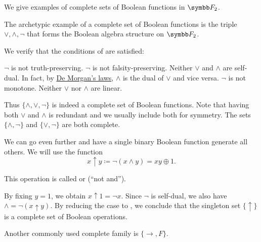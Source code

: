 \begin{example}\label{ex:thm:posts_completeness_theorem}
  We give examples of complete sets of Boolean functions in \( \BF_2 \).

  \begin{ExEnum}
     The archetypic example of a complete set of Boolean functions is the triple \( \vee, \wedge, \neg \) that forms the Boolean algebra structure on \( \BF_2 \).

    We verify that the conditions of  are satisfied:
    \begin{RefList}
       \( \neg \) is not truth-preserving.
       \( \neg \) is not falsity-preserving.
       Neither \( \vee \) and \( \wedge \) are self-dual. In fact, by \hyperref[thm:de_morgans_laws]{De Morgan's laws}, \( \wedge \) is the dual of \( \vee \) and vice versa.
       \( \neg \) is not monotone.
       Neither \( \vee \) nor \( \wedge \) are linear.
    \end{RefList}

    Thus \( \{ \wedge, \vee, \neg \} \) is indeed a complete set of Boolean functions. Note that having both \( \vee \) and \( \wedge \) is redundant and we usually include both for symmetry. The sets \( \{ \wedge, \neg \} \) and \( \{ \vee, \neg \} \) are both complete.

     We can go even further and have a single binary Boolean function generate all others. We will use the function
    \begin{equation}\label{eq:ex:posts_completeness_theorem/nand}
      x \uparrow y \coloneqq \neg(x \wedge y) = xy \oplus 1.
    \end{equation}

    This operation is called  or  (\enquote{not and}).

    By fixing \( y = 1 \), we obtain \( x \uparrow 1 = \neg x \). Since \( \neg \) is self-dual, we also have \( \wedge = \neg(x \uparrow y) \). By reducing the case to , we conclude that the singleton set \( \{ \uparrow \} \) is a complete set of Boolean operations.

     Another commonly used complete family is \( \{ \rightarrow, F \} \).


\end{ExEnum}
\end{example}
